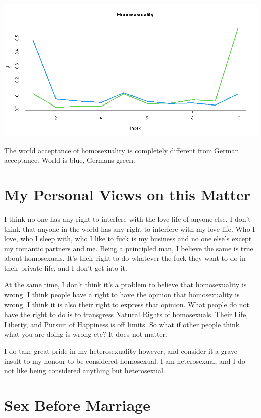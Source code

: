 \documentclass{amsart}
\begin{document}
\includegraphics[scale=0.5]{gay.jpeg}

The world acceptance of homosexuality is completely different from German acceptance.  World is blue, Germans green.

\section{My Personal Views on this Matter}

I think no one has any right to interfere with the love life of anyone else.  I don't think that anyone in the world has any right to interfere with my love life.  Who I love, who I sleep with, who I like to fuck is my business and no one else's except my romantic partners and me.  Being a principled man, I believe the same is true about homosexuals.  It's their right to do whatever the fuck they want to do in their private life, and I don't get into it.

At the same time, I don't think it's a problem to believe that homosexuality is wrong.  I think people have a right to have the opinion that homosexuality is wrong.  I think it is also their right to express that opinion.  What people do not have the right to do is to transgress Natural Rights of homosexuals.  Their Life, Liberty, and Pursuit of Happiness is off limits.  So what if other people think what you are doing is wrong etc?  It does not matter.  

I do take great pride in my heterosexuality however, and consider it a grave insult to my honour to be considered homosexual.  I am heterosexual, and I do not like being considered anything but heterosexual.

\section{Sex Before Marriage}
\end{document}
